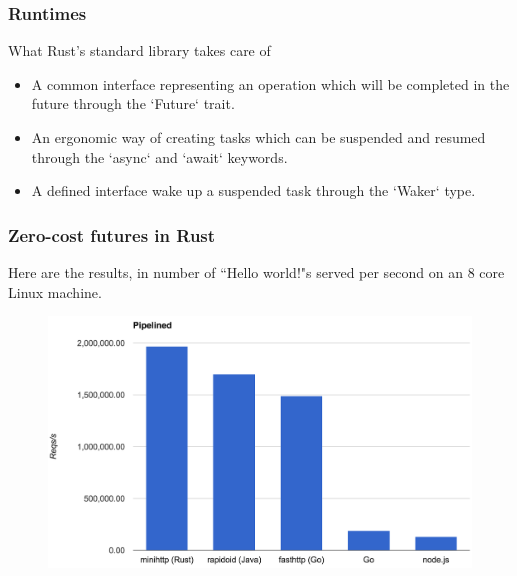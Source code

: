 \begin{frame}[fragile]
    \frametitle{Runtimes}
    {\color{red}What Rust's standard library takes care of}
    \begin{itemize}
        \item A {\color{red}common interface} representing an operation which will be completed in the future through the `Future` trait.
        \item An ergonomic way of {\color{red}creating tasks} which can be suspended and resumed through the `async` and `await` keywords.
        \item A defined interface wake up a suspended task through the `Waker` type.
    \end{itemize}
\end{frame}


\begin{frame}[fragile]
    \frametitle{Zero-cost futures in Rust}
% 
% 
Here are the results, in number of “Hello world!"s served per second on an 8 core Linux machine.
% 
    \begin{figure}
        
     
    \includegraphics[width=0.6\linewidth]{figs/bench-pipelined.png}
    \end{figure}
% 
\end{frame}
